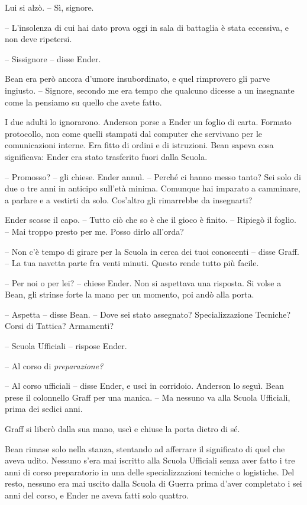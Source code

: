 {Lui si alzò. -- Sì, signore.}

{-- L'insolenza di cui hai dato prova oggi in sala di battaglia è stata
	eccessiva, e non deve ripetersi.}

{-- Sissignore -- disse Ender.}

{Bean era però ancora d'umore insubordinato, e quel rimprovero gli parve
	ingiusto. -- Signore, secondo me era tempo che qualcuno dicesse a un
	insegnante come la pensiamo su quello che avete fatto.}

{I due adulti lo ignorarono. Anderson porse a Ender un foglio di carta.
	Formato protocollo, non come quelli stampati dal computer che servivano
	per le comunicazioni interne. Era fitto di ordini e di istruzioni. Bean
	sapeva cosa significava: Ender era stato trasferito fuori dalla Scuola.}

{-- Promosso? -- gli chiese. Ender annuì. -- Perché ci hanno messo
	tanto? Sei solo di due o tre anni in anticipo sull'età minima. Comunque
	hai imparato a camminare, a parlare e a vestirti da solo. Cos'altro gli
	rimarrebbe da insegnarti?}

{Ender scosse il capo. -- Tutto ciò che so è che il gioco è finito. --
	Ripiegò il foglio. -- Mai troppo presto per me. Posso dirlo all'orda?}

{-- Non c'è tempo di girare per la Scuola in cerca dei tuoi conoscenti
	-- disse Graff. -- La tua navetta parte fra venti minuti. Questo rende
	tutto più facile.}

{-- Per noi o per lei? -- chiese Ender. Non si aspettava una risposta.
	Si volse a Bean, gli strinse forte la mano per un momento, poi andò alla
	porta.}

{-- Aspetta -- disse Bean. -- Dove sei stato assegnato? Specializzazione
	Tecniche? Corsi di Tattica? Armamenti?}

{-- Scuola Ufficiali -- rispose Ender.}

{-- Al corso di \emph{preparazione?}}

{-- Al corso ufficiali -- disse Ender, e uscì in corridoio. Anderson lo
	seguì. Bean prese il colonnello Graff per una manica. -- Ma nessuno va
	alla Scuola Ufficiali, prima dei sedici anni.}

{Graff si liberò dalla sua mano, uscì e chiuse la porta dietro di sé.}

{Bean rimase solo nella stanza, stentando ad afferrare il significato di
	quel che aveva udito. Nessuno s'era mai iscritto alla Scuola Ufficiali
	senza aver fatto i tre anni di corso preparatorio in una delle
	specializzazioni tecniche o logistiche. Del resto, nessuno era mai
	uscito dalla Scuola di Guerra prima d'aver completato i sei anni del
	corso, e Ender ne aveva fatti solo quattro.}

